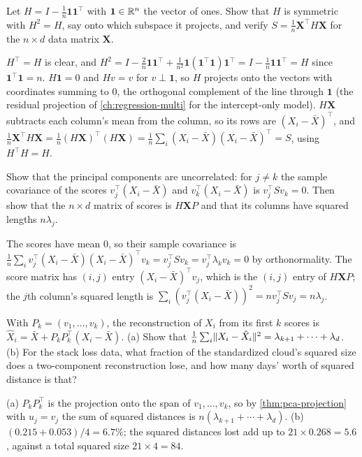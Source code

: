 \begin{exercise}
\label{ex:pca-projector}
Let $H = I - \frac1n\mathbf{1}\mathbf{1}^\top$ with $\mathbf{1} \in \mathbb{R}^n$ the vector of ones. Show that $H$ is symmetric with $H^2 = H$, say onto which subspace it projects, and verify $S = \frac1n\mathbf{X}^\top H\mathbf{X}$ for the $n \times d$ data matrix $\mathbf{X}$.
\end{exercise}
\begin{solution}
$H^\top = H$ is clear, and $H^2 = I - \frac2n\mathbf{1}\mathbf{1}^\top + \frac{1}{n^2}\mathbf{1}(\mathbf{1}^\top\mathbf{1})\mathbf{1}^\top = I - \frac1n\mathbf{1}\mathbf{1}^\top = H$ since $\mathbf{1}^\top\mathbf{1} = n$. $H\mathbf{1} = 0$ and $Hv = v$ for $v \perp \mathbf{1}$, so $H$ projects onto the vectors with coordinates summing to $0$, the orthogonal complement of the line through $\mathbf{1}$ (the residual projection of \cref{ch:regression-multi} for the intercept-only model). $H\mathbf{X}$ subtracts each column's mean from the column, so its rows are $(X_i - \bar{X})^\top$, and $\frac1n\mathbf{X}^\top H\mathbf{X} = \frac1n(H\mathbf{X})^\top(H\mathbf{X}) = \frac1n\sum_i(X_i - \bar{X})(X_i - \bar{X})^\top = S$, using $H^\top H = H$.
\end{solution}

\begin{exercise}
\label{ex:pca-scores}
Show that the principal components are uncorrelated: for $j \neq k$ the sample covariance of the scores $v_j^\top(X_i - \bar{X})$ and $v_k^\top(X_i - \bar{X})$ is $v_j^\top Sv_k = 0$. Then show that the $n \times d$ matrix of scores is $H\mathbf{X}P$ and that its columns have squared lengths $n\lambda_j$.
\end{exercise}
\begin{solution}
The scores have mean $0$, so their sample covariance is $\frac1n\sum_iv_j^\top(X_i - \bar{X})(X_i - \bar{X})^\top v_k = v_j^\top Sv_k = v_j^\top\lambda_kv_k = 0$ by orthonormality. The score matrix has $(i, j)$ entry $(X_i - \bar{X})^\top v_j$, which is the $(i, j)$ entry of $H\mathbf{X}P$; the $j$th column's squared length is $\sum_i(v_j^\top(X_i - \bar{X}))^2 = nv_j^\top Sv_j = n\lambda_j$.
\end{solution}

\begin{exercise}
\label{ex:pca-reconstruct}
With $P_k = (v_1, \ldots, v_k)$, the reconstruction of $X_i$ from its first $k$ scores is $\hat{X}_i = \bar{X} + P_kP_k^\top(X_i - \bar{X})$. (a) Show that $\frac1n\sum_i\lVert X_i - \hat{X}_i\rVert^2 = \lambda_{k+1} + \cdots + \lambda_d$. (b) For the stack loss data, what fraction of the standardized cloud's squared size does a two-component reconstruction lose, and how many days' worth of squared distance is that?
\end{exercise}
\begin{solution}
(a) $P_kP_k^\top$ is the projection onto the span of $v_1, \ldots, v_k$, so by \cref{thm:pca-projection} with $u_j = v_j$ the sum of squared distances is $n(\lambda_{k+1} + \cdots + \lambda_d)$. (b) $(0.215 + 0.053)/4 = 6.7\%$; the squared distances lost add up to $21 \times 0.268 = 5.6$, against a total squared size $21 \times 4 = 84$.
\end{solution}

